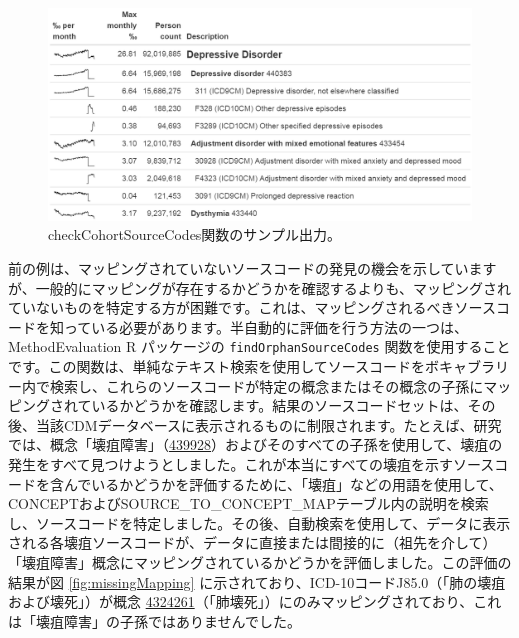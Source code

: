 \documentclass[
  11pt]{book}
\theoremstyle{definition}
\theoremstyle{definition}
\theoremstyle{definition}
\theoremstyle{definition}
\theoremstyle{remark}
\begin{document}
\begin{figure}

{\centering \includegraphics[width=1\linewidth]{images/DataQuality/sourceCodes} 

}

\caption{checkCohortSourceCodes関数のサンプル出力。}\label{fig:sourceCodes}
\end{figure}

前の例は、マッピングされていないソースコードの発見の機会を示していますが、一般的にマッピングが存在するかどうかを確認するよりも、マッピングされていないものを特定する方が困難です。これは、マッピングされるべきソースコードを知っている必要があります。半自動的に評価を行う方法の一つは、MethodEvaluation R パッケージの \texttt{findOrphanSourceCodes} 関数を使用することです。この関数は、単純なテキスト検索を使用してソースコードをボキャブラリー内で検索し、これらのソースコードが特定の概念またはその概念の子孫にマッピングされているかどうかを確認します。結果のソースコードセットは、その後、当該CDMデータベースに表示されるものに制限されます。たとえば、研究では、概念「壊疽障害」（\href{http://athena.ohdsi.org/search-terms/terms/439928}{439928}）およびそのすべての子孫を使用して、壊疽の発生をすべて見つけようとしました。これが本当にすべての壊疽を示すソースコードを含んでいるかどうかを評価するために、「壊疽」などの用語を使用して、CONCEPTおよびSOURCE\_TO\_CONCEPT\_MAPテーブル内の説明を検索し、ソースコードを特定しました。その後、自動検索を使用して、データに表示される各壊疽ソースコードが、データに直接または間接的に（祖先を介して）「壊疽障害」概念にマッピングされているかどうかを評価しました。この評価の結果が図 \ref{fig:missingMapping} に示されており、ICD-10コードJ85.0（「肺の壊疽および壊死」）が概念 \href{http://athena.ohdsi.org/search-terms/terms/4324261}{4324261}（「肺壊死」）にのみマッピングされており、これは「壊疽障害」の子孫ではありませんでした。
\end{document}
